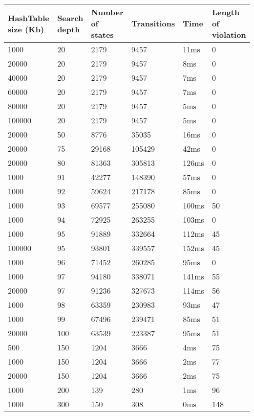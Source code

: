 \begin{longtable}{l|l|l|l|l|l}
HashTable size (Kb) & Search depth & Number of states & Transitions & Time & Length of violation \\
\hline
\rowcolor{red!40}1000 & 20 & 2179 & 9457 & 11ms & 0 \\
\rowcolor{red!40}20000 & 20 & 2179 & 9457 & 8ms & 0 \\
\rowcolor{red!40}40000 & 20 & 2179 & 9457 & 7ms & 0 \\
\rowcolor{red!40}60000 & 20 & 2179 & 9457 & 7ms & 0 \\
\rowcolor{red!40}80000 & 20 & 2179 & 9457 & 5ms & 0 \\
\rowcolor{red!40}100000 & 20 & 2179 & 9457 & 5ms & 0 \\
\rowcolor{red!40}20000 & 50 & 8776 & 35035 & 16ms & 0 \\
\rowcolor{red!40}20000 & 75 & 29168 & 105429 & 42ms & 0 \\
\rowcolor{red!40}20000 & 80 & 81363 & 305813 & 126ms & 0 \\
\rowcolor{red!40}1000 & 91 & 42277 & 148390 & 57ms & 0 \\
\rowcolor{red!40}1000 & 92 & 59624 & 217178 & 85ms & 0 \\
1000 & 93 & 69577 & 255080 & 100ms & 50 \\
\rowcolor{red!40}1000 & 94 & 72925 & 263255 & 103ms & 0 \\
1000 & 95 & 91889 & 332664 & 112ms & \cellcolor{green!40}45 \\
100000 & 95 & 93801 & 339557 & 152ms & \cellcolor{green!40}45 \\
\rowcolor{red!40}1000 & 96 & 71452 & 260285 & 95ms & 0 \\
1000 & 97 & 94180 & 338071 & 141ms & 55 \\
20000 & 97 & 91236 & 327673 & 114ms & 56 \\
1000 & 98 & 63359 & 230983 & 93ms & 47 \\
1000 & 99 & 67496 & 239471 & 85ms & 51 \\
20000 & 100 & 63539 & 223387 & 95ms & 51 \\
500 & 150 & 1204 & 3666 & 4ms & 75 \\
1000 & 150 & 1204 & 3666 & 2ms & 77 \\
20000 & 150 & 1204 & 3666 & 2ms & 75 \\
1000 & 200 & \cellcolor{green!40}139 & \cellcolor{green!40}280 & 1ms & 96 \\
1000 & 300 & 150 & 308 & 0ms & 148 \\

\end{longtable}
